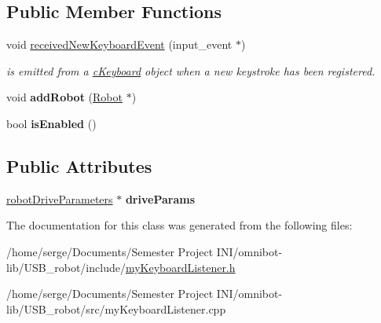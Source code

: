 \subsection*{Public Member Functions}
\begin{DoxyCompactItemize}
\item 
\hypertarget{classmy_keyboard_listener_a38e4fe0293a178aa108a092928c69f13}{}void \hyperlink{classmy_keyboard_listener_a38e4fe0293a178aa108a092928c69f13}{received\+New\+Keyboard\+Event} (input\+\_\+event $\ast$)\label{classmy_keyboard_listener_a38e4fe0293a178aa108a092928c69f13}

\begin{DoxyCompactList}\small\item\em is emitted from a \hyperlink{classc_keyboard}{c\+Keyboard} object when a new keystroke has been registered. \end{DoxyCompactList}\item 
\hypertarget{classmy_keyboard_listener_a58bbdff3ddabad3be69842425bd7137e}{}void {\bfseries add\+Robot} (\hyperlink{class_robot}{Robot} $\ast$)\label{classmy_keyboard_listener_a58bbdff3ddabad3be69842425bd7137e}

\item 
\hypertarget{classmy_keyboard_listener_ab872b8eea1b5b74f24bb67d456e8ce1d}{}bool {\bfseries is\+Enabled} ()\label{classmy_keyboard_listener_ab872b8eea1b5b74f24bb67d456e8ce1d}

\end{DoxyCompactItemize}
\subsection*{Public Attributes}
\begin{DoxyCompactItemize}
\item 
\hypertarget{classmy_keyboard_listener_ac5e0ea7bc8dbff0501aaac437fcc17b9}{}\hyperlink{structrobot_drive_parameters}{robot\+Drive\+Parameters} $\ast$ {\bfseries drive\+Params}\label{classmy_keyboard_listener_ac5e0ea7bc8dbff0501aaac437fcc17b9}

\end{DoxyCompactItemize}


The documentation for this class was generated from the following files\+:\begin{DoxyCompactItemize}
\item 
/home/serge/\+Documents/\+Semester Project I\+N\+I/omnibot-\/lib/\+U\+S\+B\+\_\+robot/include/\hyperlink{my_keyboard_listener_8h}{my\+Keyboard\+Listener.\+h}\item 
/home/serge/\+Documents/\+Semester Project I\+N\+I/omnibot-\/lib/\+U\+S\+B\+\_\+robot/src/my\+Keyboard\+Listener.\+cpp\end{DoxyCompactItemize}
